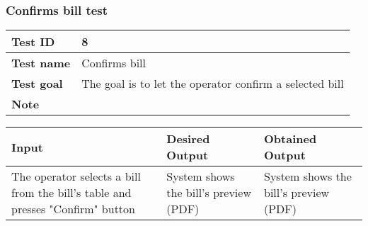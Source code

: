 {{		\subsubsection{Confirms bill test}{
			\begin{center}
			\begin{tabular}{|p{4cm}|p{10cm}|}
			\hline
				\centering \vspace{1mm} \bfseries{Test ID} \vspace{1mm} & 
				\vspace{1mm} 8 \vspace{1mm}\\
			\hline
				\centering \vspace{1mm} \bfseries{Test name} \vspace{1mm} & 
				\vspace{1mm} Confirms bill \vspace{1mm}\\
			\hline
				\centering \vspace{1mm} \bfseries{Test goal} \vspace{1mm} & 
				\vspace{1mm} The goal is to let the operator confirm a selected bill\vspace{1mm}\\
			\hline
				\centering \vspace{1mm} \bfseries{Note} \vspace{1mm} & 
				\vspace{1mm}  \vspace{1mm}\\
			\hline
			\end{tabular}

			\begin{tabular}{|p{4cm}|p{5cm}|p{5cm}|}
			\hline
			\centering \vspace{1mm} \bfseries{Input} \vspace{1mm} & \vspace{1mm} \bfseries{Desired Output} \vspace{1mm} & \vspace{1mm} \bfseries{Obtained Output} \vspace{1mm}\\
			\hline
				\vspace{1mm} The operator selects a bill from the bill's table and presses "Confirm" button \vspace{1mm} &
				\vspace{1mm} System shows the bill's preview (PDF) \vspace{1mm} & 
				\vspace{1mm} System shows the bill's preview (PDF) \vspace{1mm} \\
			\hline
			\end{tabular}
			\end{center}
		}
		\clearpage

}}
